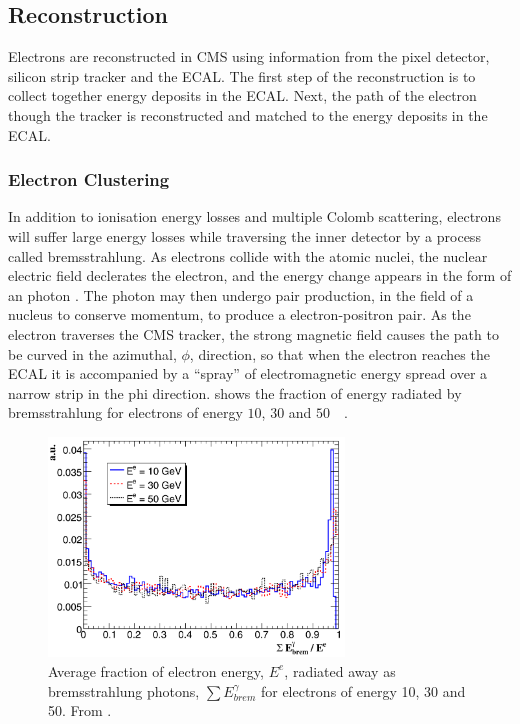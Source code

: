 \subsection{Reconstruction}
Electrons are reconstructed in CMS using information from the pixel detector,
silicon strip tracker and the ECAL.  The first step of the reconstruction is to
collect together energy deposits in the ECAL. Next, the path of the electron
though the tracker is reconstructed and matched to the energy deposits in the
ECAL\cite{baffioni2007electron,adam2009electron}.

\subsubsection{Electron Clustering}

In addition to ionisation energy losses and multiple Colomb scattering,
electrons will suffer large energy losses while traversing the inner detector
by a process called bremsstrahlung. 
As electrons collide with the atomic nuclei, the nuclear electric field
declerates the electron, and the energy change appears in the form of an photon
\cite{perkins2000introduction}.
The photon may then undergo pair production, in the field of a nucleus to
conserve momentum, to produce a electron-positron pair.
As the electron traverses the CMS tracker, the strong magnetic
field causes the path to be curved in the azimuthal, $\phi$,
direction, so that when the electron reaches the {ECAL} it is accompanied
by a ``spray'' of electromagnetic energy spread over a narrow strip in the phi direction.
 shows the fraction of energy radiated by bremsstrahlung for
electrons of energy $10$, $30$ and \unit{$50$}{\GeV}
\cite{baffioni2007electron}.

\begin{figure}[htbp]
  \centering
  \includegraphics[width=0.7\textwidth]{brem}
  \caption{Average fraction of electron energy, $E^{e}$, radiated away as bremsstrahlung
photons, $\sum E_{brem}^{\gamma}$ for electrons of energy 10, 30 and
\unit{50}{\GeV}. From \cite{baffioni2007electron}. } 
\label{fig:brem}
\end{figure}

